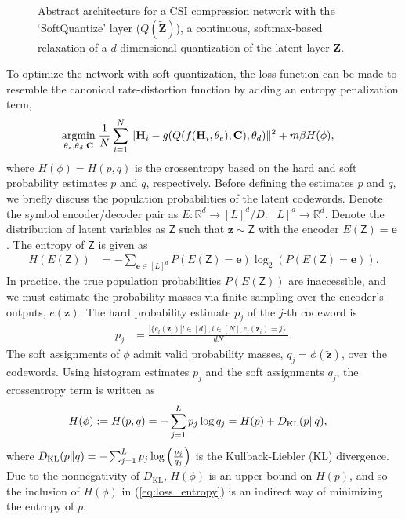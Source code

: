 \begin{figure*}[!hbtp]
\centering
\def\svgwidth{0.8\linewidth}

\caption{Abstract architecture for a CSI compression network with the `SoftQuantize' layer ($Q(\tilde{\mathbf Z})$), a continuous, softmax-based relaxation of a $d$-dimensional quantization of the latent layer $\mathbf Z$.}
\label{fig:csinet_quant}
\end{figure*}

To optimize the network with soft quantization, the loss function can be made to resemble the canonical rate-distortion function by adding an entropy penalization term,
\begin{align}
\underset{\theta_e, \theta_d, \mathbf C}{\text{argmin}}\; \frac 1N &\sum_{i=1}^N\Arrowvert \mathbf H_i - g(Q(f(\mathbf H_i, \theta_e), \mathbf C), \theta_d) \Arrowvert^2 + m\beta H(\phi), \label{eq:loss_entropy}
\end{align}
where $H(\phi)=H(p,q)$ is the crossentropy based on the hard and soft probability estimates $p$ and $q$, respectively. Before defining the estimates $p$ and $q$, we briefly discuss the population probabilities of the latent codewords. Denote the symbol encoder/decoder pair as $E:\mathbb R^d \to [L]^d$/$D:[L]^d \to \mathbb R^d$. Denote the distribution of latent variables as $\mathsf Z$ such that $\mathbf z \sim \mathsf Z$ with the encoder $E(\mathsf Z)=\mathbf e$ . The entropy of $\mathsf Z$ is given as 
\begin{align*}
H(E(\mathsf Z)) &= -\sum_{\mathbf e\in[L]^d}P(E(\mathsf Z) = \mathbf e)\log_2(P(E(\mathsf Z)=\mathbf e)).
\end{align*}
In practice, the true population probabilities $P(E(\mathsf Z))$ are inaccessible, and we must estimate the probability masses via finite sampling over the encoder's outputs, $e(\mathbf z)$. The hard probability estimate $p_j$ of the $j$-th codeword is
\begin{align*}
p_j &= \frac{|\{e_l(\mathbf z_i)|l\in[d], i \in [N], e_l(\mathbf z_i)=j\}|}{dN}.
\end{align*}
The soft assignments of $\phi$ admit valid probability masses, $q_j = \phi(\tilde{\mathbf z})$, over the codewords. Using histogram estimates $p_j$ and the soft assignments $q_j$, the crossentropy term is written as
\begin{align*}
H(\phi) := H(p,q) &= -\sum_{j=1}^L p_j\log q_j = H(p) + D_{\text{KL}}(p\Arrowvert q),
\end{align*}
where $D_{\text{KL}}(p\Arrowvert q)=-\sum_{j=1}^L p_j \log\left(\frac{p_j}{q_j}\right)$ is the Kullback-Liebler (KL) divergence. Due to the nonnegativity of $D_{\text{KL}}$, $H(\phi)$ is an upper bound on $H(p)$, and so the inclusion of $H(\phi)$ in (\ref{eq:loss_entropy}) is an indirect way of minimizing the entropy of $p$.
